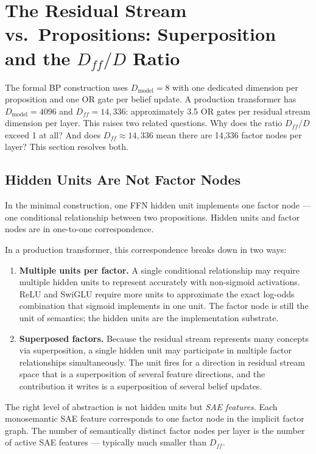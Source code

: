 \section{The Residual Stream vs.\ Propositions: Superposition and the $D_{ff}/D$ Ratio}
\label{sec:superposition}

The formal BP construction uses $D_{\mathrm{model}} = 8$ with one dedicated dimension per
proposition and one OR gate per belief update. A production transformer has $D_{\mathrm{model}}
= 4096$ and $D_{ff} = 14{,}336$: approximately 3.5 OR gates per residual stream dimension per
layer. This raises two related questions. Why does the ratio $D_{ff}/D$ exceed 1 at all? And
does $D_{ff} \approx 14{,}336$ mean there are 14,336 factor nodes per layer? This section
resolves both.

\subsection*{Hidden Units Are Not Factor Nodes}

In the minimal construction, one FFN hidden unit implements one factor node --- one
conditional relationship between two propositions. Hidden units and factor nodes are in
one-to-one correspondence.

In a production transformer, this correspondence breaks down in two ways:

\begin{enumerate}
\item \textbf{Multiple units per factor.} A single conditional relationship may require
multiple hidden units to represent accurately with non-sigmoid activations. ReLU and SwiGLU
require more units to approximate the exact log-odds combination that sigmoid implements in
one unit. The factor node is still the unit of semantics; the hidden units are the
implementation substrate.

\item \textbf{Superposed factors.} Because the residual stream represents many concepts via
superposition, a single hidden unit may participate in multiple factor relationships
simultaneously. The unit fires for a direction in residual stream space that is a
superposition of several feature directions, and the contribution it writes is a superposition
of several belief updates.
\end{enumerate}

The right level of abstraction is not hidden units but \emph{SAE features}. Each monosemantic
SAE feature corresponds to one factor node in the implicit factor graph. The number of
semantically distinct factor nodes per layer is the number of active SAE features --- typically
much smaller than $D_{ff}$.

